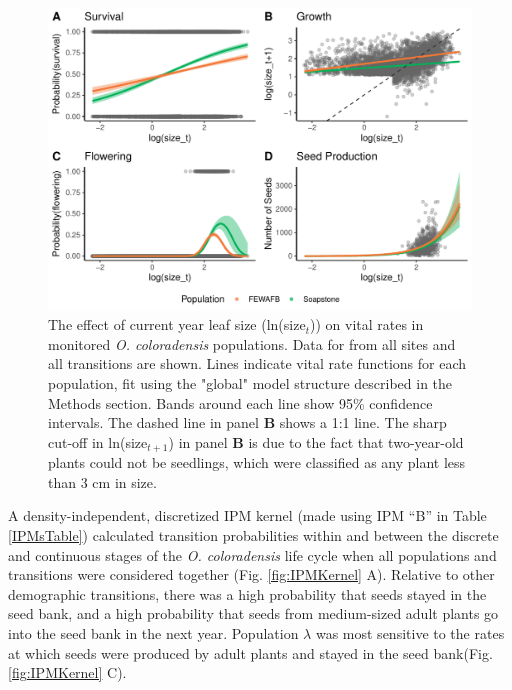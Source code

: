 \documentclass[12pt, letterpaper]{article}
\begin{document}
\begin{figure}[h!]
  \centering
  \includegraphics[width=\textwidth]{figures/vitalRateModelFit.pdf}
  \caption{\internallinenumbers The effect of current year leaf size (ln(size$_t$)) on vital rates in monitored \textit{O. coloradensis} populations. Data for from all sites and all transitions are shown. Lines indicate vital rate functions for each population, fit using the "global" model structure described in the Methods section. Bands around each line show 95\% confidence intervals. The dashed line in panel \textbf{B} shows a 1:1 line. The sharp cut-off in ln(size$_{t+1}$) in panel \textbf{B} is due to the fact that two-year-old plants could not be seedlings, which were classified as any plant less than 3 cm in size.}
  \label{fig:vitalRates}
\end{figure} 

A density-independent, discretized IPM kernel (made using IPM “B” in Table \ref{IPMsTable}) calculated transition probabilities within and between the discrete and continuous stages of the \textit{O. coloradensis} life cycle when all populations and transitions were considered together (Fig. \ref{fig:IPMKernel} A). Relative to other demographic transitions, there was a high probability that seeds stayed in the seed bank, and a high probability that seeds from medium-sized adult plants go into the seed bank in the next year. Population $\lambda$ was most sensitive to the rates at which seeds were produced by adult plants and stayed in the seed bank(Fig. \ref{fig:IPMKernel} C).
\end{document}
